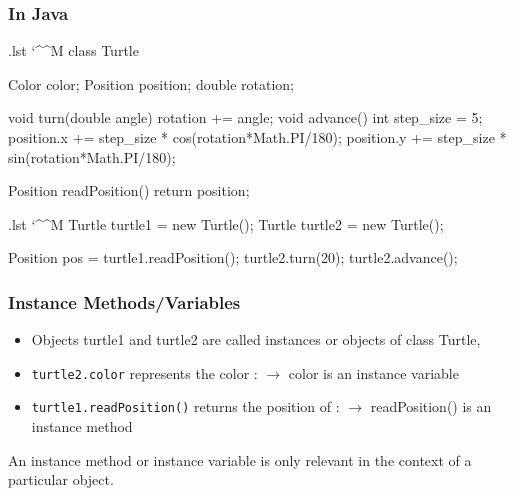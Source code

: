\documentclass[10pt, handout]{beamer}
\makeatletter
\newenvironment{code}{%
  \begingroup
  \@bsphack
  \immediate\openout\lstvrb@out\jobname.lst
  \let\do\@makeother\dospecials\catcode`\^^M\active
  \def\verbatim@processline{%
    \immediate\write\lstvrb@out{\the\verbatim@line}}%
  \verbatim@start}{%
  \immediate\closeout\lstvrb@out
  \@esphack
  \endgroup

  \begin{alertblock}{}
    
  \end{alertblock}}
\makeatother
\begin{document}
\begin{frame}
  \frametitle{In Java}
  \begin{code}
class Turtle {
  Color color;
  Position position;
  double rotation;

  void turn(double angle) { rotation += angle; }
  void advance() {
    int step_size = 5;
    position.x += step_size * cos(rotation*Math.PI/180);
    position.y += step_size * sin(rotation*Math.PI/180);
  }

  Position readPosition() {
    return position;
  }
}
  \end{code}
  \pause
  \begin{code}
Turtle turtle1 = new Turtle();
Turtle turtle2 = new Turtle();

Position pos = turtle1.readPosition();
turtle2.turn(20); turtle2.advance();
  \end{code}
\end{frame}

\begin{frame}[fragile]
  \frametitle{Instance Methods/Variables}
  \begin{itemize}
  \item Objects turtle1 and turtle2 are called \alert{instances or objects} of class Turtle,
  \item \lstinline!turtle2.color! represents the color :
    \newline $\rightarrow$ \alert{color is an instance variable}
  \item \lstinline!turtle1.readPosition()! returns the position of :
    \newline $\rightarrow$ \alert{readPosition() is an instance method}
  \end{itemize}

  \begin{definition}
    An instance method or instance variable is only relevant in the context of a particular object.
  \end{definition}
\end{frame}
\end{document}
